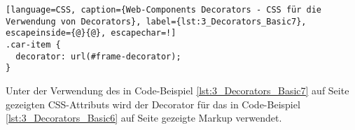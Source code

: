 \begin{lstlisting}[language=CSS, caption={Web-Components Decorators - CSS für die Verwendung von Decorators}, label={lst:3_Decorators_Basic7}, escapeinside={@}{@}, escapechar=!]
.car-item {
  decorator: url(#frame-decorator);
}
\end{lstlisting}

Unter der Verwendung des in Code-Beispiel \ref{lst:3_Decorators_Basic7} auf Seite \pageref{lst:3_Decorators_Basic7} gezeigten CSS-Attributs wird der Decorator für das in Code-Beispiel \ref{lst:3_Decorators_Basic6} auf Seite \pageref{lst:3_Decorators_Basic6} gezeigte Markup verwendet.
